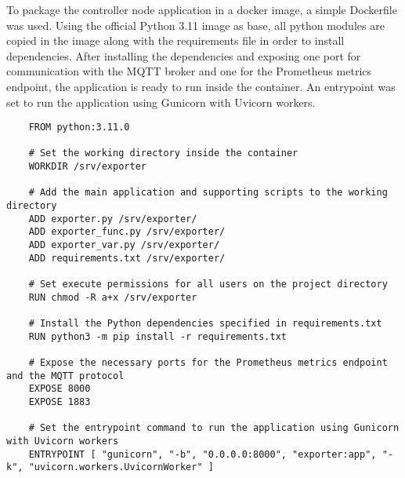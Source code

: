 To package the controller node application in a docker image, a simple Dockerfile was used. Using the official Python 3.11 image as base, all python modules are copied in the image along with the requirements file in order to install dependencies. After installing the dependencies and exposing one port for communication with the MQTT broker and one for the Prometheus metrics endpoint, the application is ready to run inside the container. An entrypoint was set to run the application using Gunicorn with Uvicorn workers.

\begin{verbatim}
    FROM python:3.11.0

    # Set the working directory inside the container
    WORKDIR /srv/exporter

    # Add the main application and supporting scripts to the working directory
    ADD exporter.py /srv/exporter/
    ADD exporter_func.py /srv/exporter/
    ADD exporter_var.py /srv/exporter/
    ADD requirements.txt /srv/exporter/

    # Set execute permissions for all users on the project directory
    RUN chmod -R a+x /srv/exporter

    # Install the Python dependencies specified in requirements.txt
    RUN python3 -m pip install -r requirements.txt

    # Expose the necessary ports for the Prometheus metrics endpoint and the MQTT protocol
    EXPOSE 8000
    EXPOSE 1883

    # Set the entrypoint command to run the application using Gunicorn with Uvicorn workers
    ENTRYPOINT [ "gunicorn", "-b", "0.0.0.0:8000", "exporter:app", "-k", "uvicorn.workers.UvicornWorker" ]
\end{verbatim}

